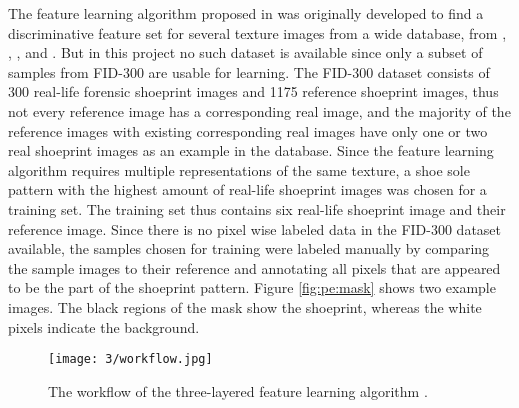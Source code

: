\documentclass[draft,final]{vutinfth} %
\begin{document}
\par
The feature learning algorithm proposed in \cite{guo2012discriminative} was originally developed to find a discriminative feature set for several texture images from a wide database, from \cite{ojala2002outex}, \cite{dana1999reflectance}, \cite{boland2001neural}, \cite{jantzen2005pap} and \cite{brahnam2007introduction}.
But in this project no such dataset is available since only a subset of samples from FID-300 are usable for learning. 
The FID-300 \cite{kortylewski2014unsupervised} dataset consists of 300 real-life forensic shoeprint images and 1175 reference shoeprint images, thus not every reference image has a corresponding real image, and the majority of the reference images with existing corresponding real images have only one or two real shoeprint images as an example in the database. 
Since the feature learning algorithm requires multiple representations of the same texture, a shoe sole pattern with the highest amount of real-life shoeprint images was chosen for a training set.
The training set thus contains six real-life shoeprint image and their reference image. 
Since there is no pixel wise labeled data in the FID-300 dataset available, the samples chosen for training were labeled manually by comparing the sample images to their reference and annotating all pixels that are appeared to be the part of the shoeprint pattern. 
Figure \ref{fig:pe:mask} shows two example images. 
The black regions of the mask show the shoeprint, whereas the white pixels indicate the background.

\begin{figure}[h]
  \centering
  \texttt{[image: 3/workflow.jpg]}
  \caption{The workflow of the three-layered feature learning algorithm  \cite{guo2012discriminative}.}
  \label{fig:pe:workflow} %
\end{figure}
\end{document}
